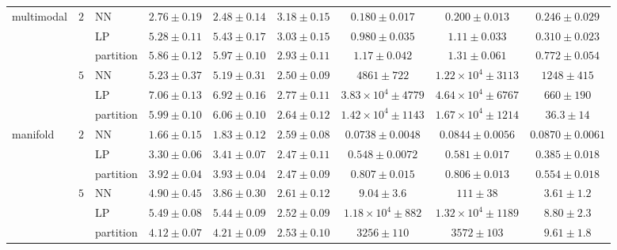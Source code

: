 \begin{table}[!t]
{\begin{tabular}{lllcccccc}
\addlinespace[2pt]
multimodal & $2$ & NN & $2.76${\scriptsize${}\pm0.19$} & $2.48${\scriptsize${}\pm0.14$} & $3.18${\scriptsize${}\pm0.15$} & $0.180${\scriptsize${}\pm0.017$} & $0.200${\scriptsize${}\pm0.013$} & $0.246${\scriptsize${}\pm0.029$}\\
 &  & LP & $5.28${\scriptsize${}\pm0.11$} & $5.43${\scriptsize${}\pm0.17$} & $3.03${\scriptsize${}\pm0.15$} & $0.980${\scriptsize${}\pm0.035$} & $1.11${\scriptsize${}\pm0.033$} & $0.310${\scriptsize${}\pm0.023$}\\
 &  & partition & $5.86${\scriptsize${}\pm0.12$} & $5.97${\scriptsize${}\pm0.10$} & $2.93${\scriptsize${}\pm0.11$} & $1.17${\scriptsize${}\pm0.042$} & $1.31${\scriptsize${}\pm0.061$} & $0.772${\scriptsize${}\pm0.054$}\\
\addlinespace[2pt]
 & $5$ & NN & $5.23${\scriptsize${}\pm0.37$} & $5.19${\scriptsize${}\pm0.31$} & $2.50${\scriptsize${}\pm0.09$} & $4861${\scriptsize${}\pm722$} & $1.22\times10^{4}${\scriptsize${}\pm3113$} & $1248${\scriptsize${}\pm415$}\\
 &  & LP & $7.06${\scriptsize${}\pm0.13$} & $6.92${\scriptsize${}\pm0.16$} & $2.77${\scriptsize${}\pm0.11$} & $3.83\times10^{4}${\scriptsize${}\pm4779$} & $4.64\times10^{4}${\scriptsize${}\pm6767$} & $660${\scriptsize${}\pm190$}\\
 &  & partition & $5.99${\scriptsize${}\pm0.10$} & $6.06${\scriptsize${}\pm0.10$} & $2.64${\scriptsize${}\pm0.12$} & $1.42\times10^{4}${\scriptsize${}\pm1143$} & $1.67\times10^{4}${\scriptsize${}\pm1214$} & $36.3${\scriptsize${}\pm14$}\\
\addlinespace[2pt]
manifold & $2$ & NN & $1.66${\scriptsize${}\pm0.15$} & $1.83${\scriptsize${}\pm0.12$} & $2.59${\scriptsize${}\pm0.08$} & $0.0738${\scriptsize${}\pm0.0048$} & $0.0844${\scriptsize${}\pm0.0056$} & $0.0870${\scriptsize${}\pm0.0061$}\\
 &  & LP & $3.30${\scriptsize${}\pm0.06$} & $3.41${\scriptsize${}\pm0.07$} & $2.47${\scriptsize${}\pm0.11$} & $0.548${\scriptsize${}\pm0.0072$} & $0.581${\scriptsize${}\pm0.017$} & $0.385${\scriptsize${}\pm0.018$}\\
 &  & partition & $3.92${\scriptsize${}\pm0.04$} & $3.93${\scriptsize${}\pm0.04$} & $2.47${\scriptsize${}\pm0.09$} & $0.807${\scriptsize${}\pm0.015$} & $0.806${\scriptsize${}\pm0.013$} & $0.554${\scriptsize${}\pm0.018$}\\
\addlinespace[2pt]
 & $5$ & NN & $4.90${\scriptsize${}\pm0.45$} & $3.86${\scriptsize${}\pm0.30$} & $2.61${\scriptsize${}\pm0.12$} & $9.04${\scriptsize${}\pm3.6$} & $111${\scriptsize${}\pm38$} & $3.61${\scriptsize${}\pm1.2$}\\
 &  & LP & $5.49${\scriptsize${}\pm0.08$} & $5.44${\scriptsize${}\pm0.09$} & $2.52${\scriptsize${}\pm0.09$} & $1.18\times10^{4}${\scriptsize${}\pm882$} & $1.32\times10^{4}${\scriptsize${}\pm1189$} & $8.80${\scriptsize${}\pm2.3$}\\
 &  & partition & $4.12${\scriptsize${}\pm0.07$} & $4.21${\scriptsize${}\pm0.09$} & $2.53${\scriptsize${}\pm0.10$} & $3256${\scriptsize${}\pm110$} & $3572${\scriptsize${}\pm103$} & $9.61${\scriptsize${}\pm1.8$}\\
\bottomrule
\end{tabular}}
\end{table}
